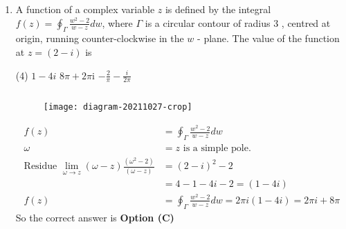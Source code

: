 \begin{enumerate}[label=\color{ocre}\textbf{\arabic*.}]
\begin{answer}
\begin{align*}
		f(z)&=\left(\frac{\pi}{\sin 4 z}\right)^{2}\\
		z_{0}&=0, \frac{\pi}{4}\text{ are poles}\\
		4 z&=n \pi, z=0, \frac{\pi}{4}
		\intertext{Others are outside the contour.}
		\text{Residue at }z&=0\text{ is }\left[\frac{\pi}{4 z-\frac{4^{3} z^{3}}{3 !}+\ldots}\right]^{2}\\
		&=\left[\frac{1}{4-\frac{4^{3} z^{2}}{3 !}+\ldots .}\right]^{2}\qquad \text{ No terms for } \frac{1}{z}, b_{1}=0\\
		&=\left[4-\frac{4^{3} z^{2}}{3 !}+\ldots .\right]^{-2}\\
		\text{Residue for }z&=\frac{\pi}{4}\\
		z-\frac{\pi}{4}&=t
		\intertext{$\sin (4 t+\pi)=-\sin 4 t \quad$ (But square so no effect)}
		&\left[\frac{t+\frac{\pi}{4}}{\sin 4\left(t+\frac{\pi}{4}\right)}\right]^{2}\\
		\left(\frac{t+\frac{\pi}{4}}{\sin 4 t}\right)^{2}&=\frac{t^{2}+\frac{\pi^{2}}{4}+2 t \cdot \frac{\pi}{4}}{\sin ^{2} 4 t}\\
		\frac{\pi}{2} \frac{t}{16 t^{2}[1-\ldots .]^{2}}&=\frac{\pi}{32 t}[1-\ldots .]^{-2} \text{(from first term)}\\
		b_{1}&=\frac{\pi}{32}\\
		\oint_{C} \frac{z^{2}}{\sin ^{2} 4 z} d z&=2 \pi i\left[0+\frac{\pi}{32}\right]=\frac{i \pi^{2}}{16}
		\end{align*}
		So the correct answer is \textbf{Option (C)}
	\end{answer}
	\item  A function of a complex variable $z$ is defined by the integral $f(z)=\oint_{\Gamma} \frac{w^{2}-2}{w-z} d w$, where $\Gamma$ is a circular contour of radius 3 , centred at origin, running counter-clockwise in the $w$ - plane. The value of the function at $z=(2-i)$ is
	{}
	\begin{tasks}(4)
		\task[\textbf{B.}] $1-4 i$
		\task[\textbf{C.}]  $8 \pi+2 \pi \mathrm{i}$
		\task[\textbf{D.}] $-\frac{2}{\pi}-\frac{i}{2 \pi}$
	\end{tasks}
	\begin{answer}$\left. \right. $
		\begin{figure}[H]
			\centering
			\texttt{[image: diagram-20211027-crop]}
		\end{figure}
		\begin{align*}
		f(z)&=\oint_{\Gamma} \frac{w^{2}-2}{w-z} d w\\
		\omega&=z\text{ is a simple pole.}\\
		\text{Residue }\lim _{\omega \rightarrow z}(\omega-z) \frac{\left(\omega^{2}-2\right)}{(\omega-z)}&=(2-i)^{2}-2 \\&=4-1-4 i-2=(1-4 i)\\
		f(z)&=\oint_{\Gamma} \frac{w^{2}-2}{w-z} d w=2 \pi i(1-4 i)=2 \pi i+8 \pi
		\end{align*}
		So the correct answer is \textbf{Option (C)}
	\end{answer}
\end{enumerate}

